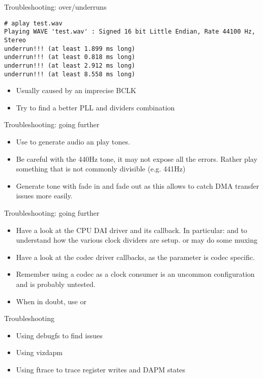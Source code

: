 \begin{frame}[fragile]{Troubleshooting: over/underruns}
  \begin{block}{}
    \fontsize{10}{10}\selectfont
    \begin{verbatim}
# aplay test.wav 
Playing WAVE 'test.wav' : Signed 16 bit Little Endian, Rate 44100 Hz, Stereo
underrun!!! (at least 1.899 ms long)
underrun!!! (at least 0.818 ms long)
underrun!!! (at least 2.912 ms long)
underrun!!! (at least 8.558 ms long)
    \end{verbatim}
  \end{block}
  \begin{itemize}
  \item Usually caused by an imprecise BCLK
  \item Try to find a better PLL and dividers combination
  \end{itemize}
\end{frame}

\begin{frame}{Troubleshooting: going further}
  \begin{itemize}
  \item Use  to generate audio an play tones.
  \item Be careful with the 440Hz tone, it may not expose all the
    errors. Rather play something that is not commonly divisible (e.g.
    441Hz)
  \item Generate tone with fade in and fade out as this allows to
    catch DMA transfer issues more easily.
  \end{itemize}
\end{frame}

\begin{frame}{Troubleshooting: going further}
  \begin{itemize}
  \item Have a look at the CPU DAI driver and its callback. In
    particular:  and  to
    understand how the various clock dividers are setup.
     or  may do some muxing
  \item Have a look at the codec driver callbacks, 
    as the  parameter is codec specific.
  \item Remember using a codec as a clock consumer is an uncommon
    configuration and is probably untested.
  \item When in doubt, use  or 
  \end{itemize}
\end{frame}

\setupdemoframe
{Troubleshooting}
{
  \begin{itemize}
  \item Using debugfs to find issues
  \item Using vizdapm
  \item Using ftrace to trace register writes and DAPM states
  \end{itemize}
}
